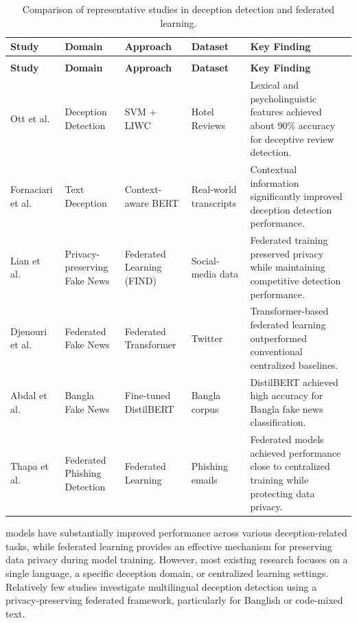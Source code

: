 {\small
\begin{longtable}{|>{\raggedright\arraybackslash}p{3.0cm}|>{\raggedright\arraybackslash}p{2.1cm}|>{\raggedright\arraybackslash}p{2.3cm}|>{\raggedright\arraybackslash}p{2.0cm}|>{\raggedright\arraybackslash}p{4.0cm}|}
\caption{Comparison of representative studies in deception detection and federated learning.}
\label{tab:lit-summary} \\
\hline
\textbf{Study} &
\textbf{Domain} &
\textbf{Approach} &
\textbf{Dataset} &
\textbf{Key Finding} \\
\hline
\endfirsthead

\multicolumn{5}{|c|}{\tablename\ \thetable\ -- continued from previous page} \\
\hline
\textbf{Study} &
\textbf{Domain} &
\textbf{Approach} &
\textbf{Dataset} &
\textbf{Key Finding} \\
\hline
\endhead

\hline
\endfoot

\hline
\endlastfoot

Ott et al.~\cite{ott2011finding}
&
Deception Detection
&
SVM + LIWC
&
Hotel Reviews
&
Lexical and psycholinguistic features achieved about 90\% accuracy for deceptive review detection.
\\ \hline

Fornaciari et al.~\cite{fornaciari2021bertective}
&
Text Deception
&
Context-aware BERT
&
Real-world transcripts
&
Contextual information significantly improved deception detection performance.
\\ \hline

Lian et al.~\cite{lian2024find}
&
Privacy-preserving Fake News
&
Federated Learning (FIND)
&
Social-media data
&
Federated training preserved privacy while maintaining competitive detection performance.
\\ \hline

Djenouri et al.~\cite{djenouri2024federated}
&
Federated Fake News
&
Federated Transformer
&
Twitter
&
Transformer-based federated learning outperformed conventional centralized baselines.
\\ \hline

Abdal et al.~\cite{abdal2023transformer}
&
Bangla Fake News
&
Fine-tuned DistilBERT
&
Bangla corpus
&
DistilBERT achieved high accuracy for Bangla fake news classification.
\\ \hline

Thapa et al.~\cite{thapa2023evaluation}
&
Federated Phishing Detection
&
Federated Learning
&
Phishing emails
&
Federated models achieved performance close to centralized training while protecting data privacy.
\\ \hline

\end{longtable}
}
models have
substantially improved performance across various deception-related tasks, while
federated learning provides an effective mechanism for preserving data privacy
during model training. 
However, most existing research focuses on a single
language, a specific deception domain, or centralized learning settings.
Relatively few studies investigate multilingual deception detection using a
privacy-preserving federated framework, particularly for Banglish or code-mixed
text.

